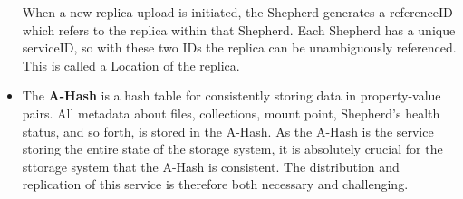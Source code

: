 \documentclass{llncs}
\begin{document}
\begin{itemize}
When a new replica upload
is initiated, the Shepherd generates a referenceID which refers to
the replica within
that Shepherd. Each Shepherd has a unique serviceID, so with these two
IDs the replica can be unambiguously referenced. This is called a Location
of the replica. %




\item The \textbf{A-Hash}  %
is a hash table for consistently storing data in property-value
pairs. All metadata about files, collections, mount point, Shepherd's
health status, and so forth, is stored in the A-Hash. As the A-Hash is
the service storing the entire state of the storage system, it is
absolutely crucial for the sttorage system that the A-Hash is
consistent. The distribution and replication of this service is
therefore both necessary and challenging.

\end{itemize}
\end{document}
